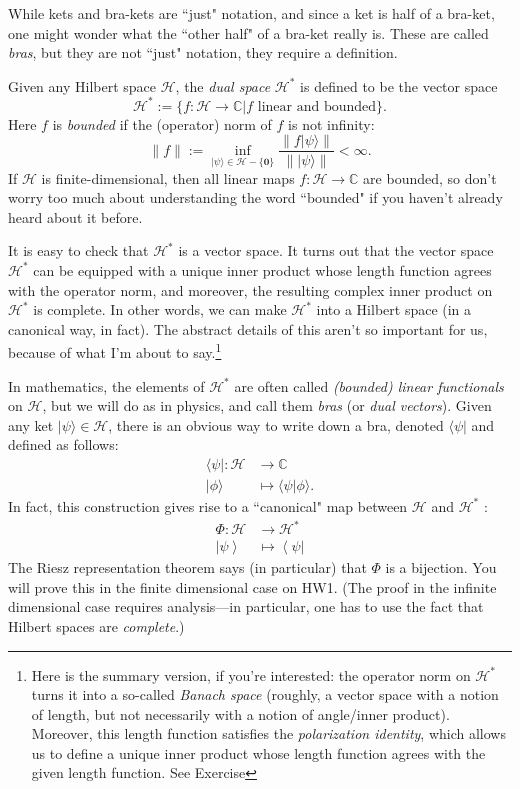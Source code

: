 \documentclass{article}
\newcommand{\ket}[1]{|#1\rangle}
\newcommand{\bra}[1]{\langle#1|}
\newcommand{\braket}[2]{\langle#1|#2\rangle}
\newcommand{\bbC}{\mathbb{C}}
\newcommand{\calH}{\mathcal{H}}
\begin{document}
While kets and bra-kets are ``just" notation, and since a ket is half of a bra-ket, one might wonder what the ``other half" of a bra-ket really is.  These are called \emph{bras}, but they are not ``just" notation, they require a definition.

Given any Hilbert space $\calH$, the \emph{dual space} $\calH^*$ is defined to be the vector space 
\[ \mathscr{H}^* := \{f: \mathscr{H} \to  \mathbb{C} | f \text{ linear and bounded}\}. \]
Here $f$ is \emph{bounded} if the (operator) norm of $f$ is not infinity:
\[ \|f\| := \inf_{\ket{\psi} \in \calH - \{\mathbf{0}\}} \frac{\|f\ket{\psi}\|}{\|\ket{\psi}\|} < \infty.\]
If $\calH$ is finite-dimensional, then all linear maps $f: \calH \to \bbC$ are bounded, so don't worry too much about understanding the word ``bounded" if you haven't already heard about it before.  

It is easy to check that $\mathscr{H}^*$ is a vector space.
It turns out that the vector space $\calH^*$ can be equipped with a unique inner product whose length function agrees with the operator norm, and moreover, the resulting complex inner product on $\calH^*$ is complete.  In other words, we can make $\calH^*$ into a Hilbert space (in a canonical way, in fact).  The abstract details of this aren't so important for us, because of what I'm about to say.\footnote{Here is the summary version, if you're interested: the operator norm on $\calH^*$ turns it into a so-called \emph{Banach space} (roughly, a vector space with a notion of length, but not necessarily with a notion of angle/inner product).  Moreover, this length function satisfies the \emph{polarization identity}, which allows us to define a unique inner product whose length function agrees with the given length function.  See Exercise }

In mathematics, the elements of $\calH^*$ are often called \emph{(bounded) linear functionals} on $\calH$, but we will do as in physics, and call them \emph{bras} (or \emph{dual vectors}).  Given any ket $\ket{\psi} \in \calH$, there is an obvious way to write down a bra, denoted $\bra{\psi}$ and defined as follows:
\[ \begin{aligned}
	\bra{\psi}: \calH &\to \bbC \\
	\ket{\phi} &\mapsto \braket{\psi}{\phi}.
\end{aligned} \]
In fact, this construction gives rise to a ``canonical" map between $\mathscr{H}$ and $\mathscr{H}^*$ :
\begin{align*}
	\Phi: \mathscr{H} &\longrightarrow \mathscr{H}^* \\
	\left| \psi \right\rangle  &\longmapsto \left\langle \psi \right| 
\end{align*}
The Riesz representation theorem says (in particular) that $\Phi$ is a bijection.  You will prove this in the finite dimensional case on HW1.  (The proof in the infinite dimensional case requires analysis---in particular, one has to use the fact that Hilbert spaces are \emph{complete}.)
\end{document}
